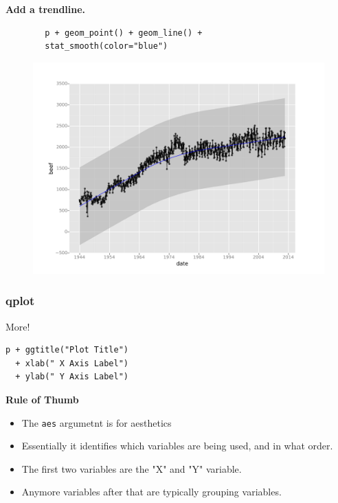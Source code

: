 \documentclass{beamer}
\begin{document}
\begin{frame}[fragile]
\textbf{	Add a trendline.}
	\begin{framed}
		\begin{verbatim}
		p + geom_point() + geom_line() +
		stat_smooth(color="blue")
		\end{verbatim}
	\end{framed}
	\begin{figure}
		\centering
		\includegraphics[width=0.7\linewidth]{layers4}
	\end{figure}
\end{frame}

\begin{frame}[fragile]
\frametitle{qplot}
\Large
\vspace{-2cm}
More!
\begin{framed}
\begin{verbatim}
p + ggtitle("Plot Title") 
  + xlab(" X Axis Label") 
  + ylab(" Y Axis Label")

\end{verbatim}
\end{framed}
\end{frame}

\begin{frame}
	\large
	\noindent \textbf{Rule of Thumb}
	\begin{itemize}
		\item The \texttt{aes} argumetnt is for aesthetics
		\item Essentially it identifies which variables are being used, and in what order.
		\item The first two variables are the "X" and "Y" variable.
		\item Anymore variables after that are typically grouping variables.
	\end{itemize}
\end{frame}
\end{document}
